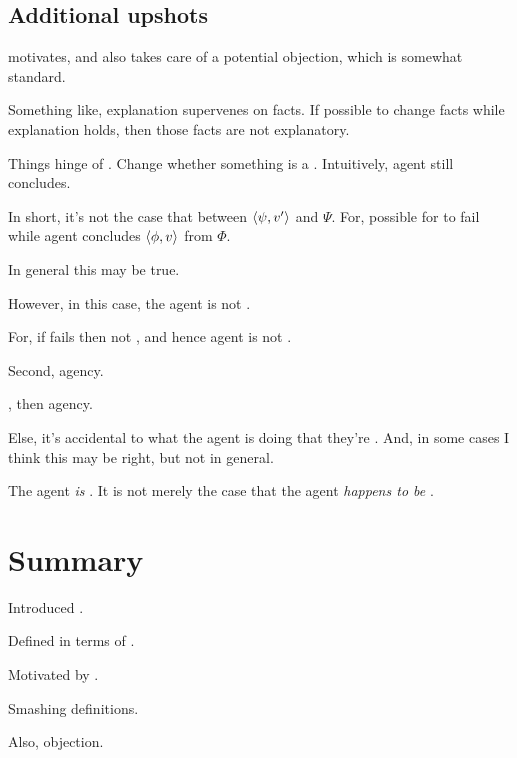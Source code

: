 \subsection{Additional upshots}

\begin{note}
  \color{red}
   motivates, and also takes care of a potential objection, which is somewhat standard.

  Something like, explanation supervenes on facts.
  If possible to change facts while explanation holds, then those facts are not explanatory.

  Things hinge of \requ{}.
  Change whether something is a \requ{}.
  Intuitively, agent still concludes.

  In short, it's not the case that \ros{} between \(\langle \psi, v' \rangle\) and \(\Psi\).
  For, possible for \ros{} to fail while agent concludes \(\langle \phi, v \rangle\) from \(\Phi\).

  In general this may be true.

  However, in this case, the agent is not \tCV{}.

  For, if \ros{} fails then not \fc{}, and hence agent is not \tCV{}.
\end{note}

\begin{note}
  Second, agency.

  \tCV{}, then agency.

  Else, it's accidental to what the agent is doing that they're \tCV{}.
  And, in some cases I think this may be right, but not in general.

  The agent \emph{is} \tCV{}.
  It is not merely the case that the agent \emph{happens to be} \tCV{}.
\end{note}




\section*{Summary}

\begin{note}
  Introduced .

  Defined in terms of \tC{}.

  Motivated by \tC{}.
\end{note}

\begin{note}
  Smashing definitions.
\end{note}

\begin{note}
  Also, objection.
\end{note}

